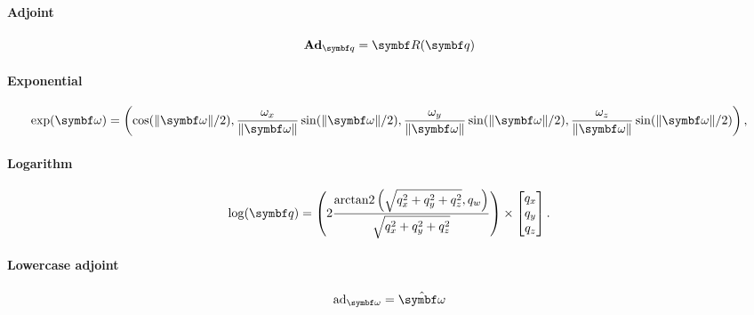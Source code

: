 \begin{properties}[breakable, title={$\SOthree$ parameterized by $\Sthree$}]
  \paragraph{Adjoint}
  \begin{equation}
    \bAd_{\bq} = \bR(\bq)
  \end{equation}

  \paragraph{Exponential}
  \begin{equation}
    \label{eq:su2_exp}\exp (\bomega) = \left(
    \cos (\| \bomega \|/2), \frac{\omega_x}{\| \bomega \|} \sin (\| \bomega \|/2), \frac{\omega_y}{\| \bomega \|} \sin (\| \bomega \|/2), \frac{\omega_z}{\| \bomega \|} \sin ( \| \bomega \|/2 ) \right), \end{equation}

  \paragraph{Logarithm}
  \begin{equation}
    \label{eq:su2_log} \log (\bq)          = \left( 2 \frac{ \arctantwo \left(\sqrt{q_x^2 + q_y^2 + q_z^2}, q_w \right) }{ \sqrt{q_x^2 + q_y^2 + q_z^2} } \right) \times \begin{bmatrix} q_{x} \\ q_{y} \\ q_{z} \end{bmatrix}.
  \end{equation}

  \paragraph{Lowercase adjoint}
  \begin{equation}
    \ad_\bomega     = \hat \bomega
  \end{equation}


\end{properties}
